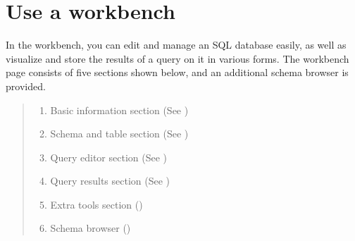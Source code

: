 \documentclass[letterpaper,10pt,english]{sphinxmanual}
\begin{document}
\section{Use a workbench}
\label{\detokenize{discovery/part06/06_03-use_a_workbench:id1}}\label{\detokenize{discovery/part06/06_03-use_a_workbench::doc}}
In the workbench, you can edit and manage an SQL database easily, as well as visualize and store the results of a query on it in various forms. The workbench page consists of five sections shown below, and an additional schema browser is provided.
\begin{quote}

\begin{figure}[H]
\centering

\noindent{}
\end{figure}
\begin{enumerate}
\def\theenumi{\arabic{enumi}}
\def\labelenumi{\theenumi .}
\makeatletter\def\p@enumii{\p@enumi \theenumi .}\makeatother
\item {} 
Basic information section (See {\hyperref[\detokenize{discovery/part06/06_03-use_a_workbench:workbench-use-1}]{}})

\item {} 
Schema and table section (See {\hyperref[\detokenize{discovery/part06/06_03-use_a_workbench:workbench-use-2}]{}})

\item {} 
Query editor section (See {\hyperref[\detokenize{discovery/part06/06_03-use_a_workbench:workbench-use-3}]{}})

\item {} 
Query results section (See {\hyperref[\detokenize{discovery/part06/06_03-use_a_workbench:workbench-use-4}]{}})

\item {} 
Extra tools section ({\hyperref[\detokenize{discovery/part06/06_03-use_a_workbench:workbench-use-5}]{}})

\item {} 
Schema browser ({\hyperref[\detokenize{discovery/part06/06_03-use_a_workbench:workbench-use-6}]{}})

\end{enumerate}
\end{quote}
\end{document}
